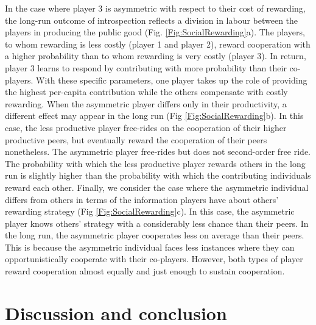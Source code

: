 \documentclass[11pt]{article}
\theoremstyle{plainCl1}
\theoremstyle{plainCl2}
\begin{document}
\noindent In the case where player 3 is asymmetric with respect to their cost of rewarding, the long-run outcome of introspection reflects a division in labour between the players in producing the public good (Fig. \ref{Fig:SocialRewarding}a). The players, to whom rewarding is less costly (player 1 and player 2), reward cooperation with a higher probability than to whom rewarding is very costly (player 3). In return, player 3 learns to respond by contributing with more probability than their co-players. With these specific parameters, one player takes up the role of providing the highest per-capita contribution while the others compensate with costly rewarding. When the asymmetric player differs only in their productivity, a different effect may appear in the long run (Fig \ref{Fig:SocialRewarding}b). In this case, the less productive player free-rides on the cooperation of their higher productive peers, but eventually reward the cooperation of their peers nonetheless. The asymmetric player free-rides but does not second-order free ride. The probability with which the less productive player rewards others in the long run is slightly higher than the probability with which the contributing individuals reward each other. Finally, we consider the case where the asymmetric individual differs from others in terms of the information players have about others' rewarding strategy (Fig \ref{Fig:SocialRewarding}c). In this case, the asymmetric player knows others' strategy with a considerably less chance than their peers. In the long run, the asymmetric player cooperates less on average than their peers. This is because the asymmetric individual faces less instances where they can opportunistically cooperate with their co-players. However, both types of player reward cooperation almost equally and just enough to sustain cooperation. 

\section{Discussion and conclusion}

\end{document}
